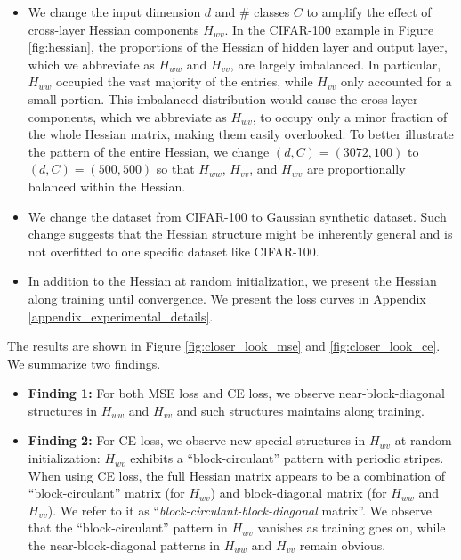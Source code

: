 \documentclass{article}
\newcommand{\1}{^{(1)}}
\newcommand{\2}{^{(2)}}
\begin{document}
\begin{itemize}[topsep=1pt,parsep=1pt,partopsep=1pt, leftmargin=*]
    \item  We change the input dimension $d$ and \# classes $C$ to amplify the effect of cross-layer Hessian components $H_{wv}$. In the CIFAR-100 example in Figure \ref{fig:hessian}, the proportions of the Hessian of hidden layer and output layer, which we abbreviate as $H_{ww}$ and $H_{vv}$, are largely imbalanced. In particular,  $H_{ww}$ occupied the vast majority of the entries, while $H_{vv}$ only accounted for a small portion. This imbalanced distribution would cause the cross-layer components, which we abbreviate as $H_{wv}$, to occupy only a minor fraction of the whole Hessian matrix, making them easily overlooked. To better illustrate the pattern of the entire Hessian, we change $(d, C) = (3072, 100)$ to $(d, C) = (500, 500)$   so that $H_{ww}$, $H_{vv}$, and $H_{wv}$ are proportionally balanced within the Hessian.
    \item We change the dataset from CIFAR-100 to Gaussian synthetic dataset. Such change suggests that the Hessian structure might be inherently general and is not  overfitted to one specific dataset like CIFAR-100. 
 
    \item In addition to the Hessian at random initialization, we present the Hessian along training until convergence. We present the loss curves in Appendix \ref{appendix_experimental_details}.
\end{itemize}


The results are shown in Figure  \ref{fig:closer_look_mse} and \ref{fig:closer_look_ce}. We summarize two findings.






\begin{itemize}[topsep=1pt,parsep=1pt,partopsep=1pt, leftmargin=*]
    \item {\bf Finding 1:} For both MSE loss and CE loss, we observe near-block-diagonal structures in $H_{ww}$ and $H_{vv}$ and such structures maintains along training.
    \item {\bf Finding 2:} For CE loss, we observe new special structures in $H_{wv}$ at random initialization: $H_{wv}$ exhibits a ``block-circulant'' pattern with periodic stripes. 
When using CE loss, the full Hessian matrix appears to be a combination of ``block-circulant'' matrix (for $H_{wv}$) and block-diagonal matrix (for $H_{ww}$ and $H_{vv}$). We refer to it as ``{\it block-circulant-block-diagonal} matrix''.  We observe that the ``block-circulant'' pattern in $H_{wv}$ vanishes as training goes on, while the near-block-diagonal patterns in  $H_{ww}$ and  $H_{vv}$ remain obvious.
\end{itemize}
\end{document}
